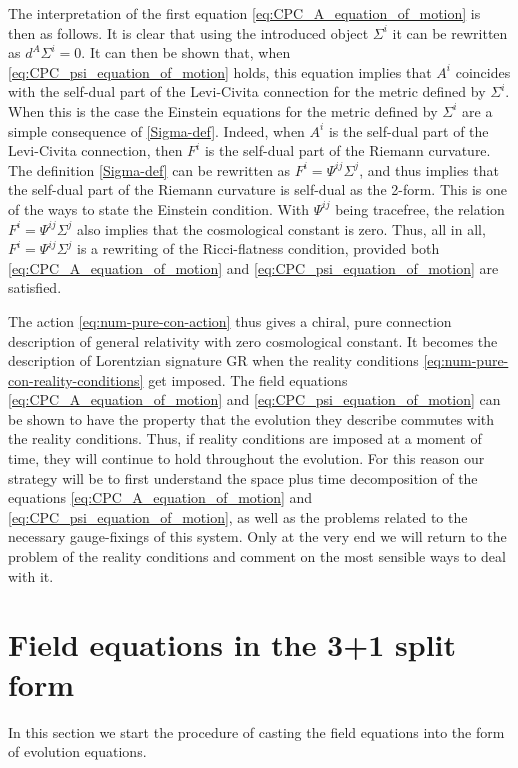 \documentclass[10pt]{report}
\theoremstyle{definition}
\begin{document}
 The interpretation of the first equation \cref{eq:CPC_A_equation_of_motion} is then as follows. It is clear that using the introduced object $\Sigma^i$ it can be rewritten as $d^A \Sigma^i=0$. It can then be shown that, when \cref{eq:CPC_psi_equation_of_motion} holds, this equation implies that $A^i$ coincides with the self-dual part of the Levi-Civita connection for the metric defined by $\Sigma^i$. When this is the case the Einstein equations for the metric defined by $\Sigma^i$ are a simple consequence of \cref{Sigma-def}. Indeed, when $A^i$ is the self-dual part of the Levi-Civita connection, then $F^i$ is the self-dual part of the Riemann curvature. The definition \cref{Sigma-def} can be rewritten as $F^i =\Psi^{ij} \Sigma^j$, and thus implies that the self-dual part of the Riemann curvature is self-dual as the 2-form. This is one of the ways to state the Einstein condition. With $\Psi^{ij}$ being tracefree, the relation $F^i =\Psi^{ij} \Sigma^j$ also implies that the cosmological constant is zero. Thus, all in all, $F^i =\Psi^{ij} \Sigma^j$ is a rewriting of the Ricci-flatness condition, provided both \cref{eq:CPC_A_equation_of_motion} and  \cref{eq:CPC_psi_equation_of_motion} are satisfied. 
 
 The action \cref{eq:num-pure-con-action} thus gives a chiral, pure connection description of general relativity with zero cosmological constant. It becomes the description of Lorentzian signature GR when the reality conditions \cref{eq:num-pure-con-reality-conditions} get imposed. The field equations \cref{eq:CPC_A_equation_of_motion} and  \cref{eq:CPC_psi_equation_of_motion} can be shown to have the property that the evolution they describe commutes with the reality conditions. Thus, if reality conditions are imposed at a moment of time, they will continue to hold throughout the evolution. For this reason our strategy will be to first understand the space plus time decomposition of the equations \cref{eq:CPC_A_equation_of_motion} and  \cref{eq:CPC_psi_equation_of_motion}, as well as the problems related to the necessary gauge-fixings of this system. Only at the very end we will return to the problem of the reality conditions and comment on the most sensible ways to deal with it. 

\section{Field equations in the 3+1 split form} \label{sec:num-pure-con-3+1}

In this section we start the procedure of casting the field equations into the form of evolution equations. 
\end{document}
